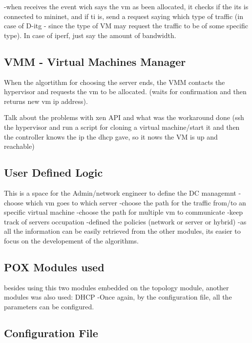 \documentclass[12pt,english,oneside]{book}
\begin{document}
-when receives the event wich says the vm as been allocated, it checks if the its is connected to mininet, and if ti is, send a request saying which type of traffic (in case of D-itg - since the type of VM may request the traffic to be of some specific type). In case of iperf, just say the amount of bandwidth.

\subsection{VMM - Virtual Machines Manager}
\hspace{0.6cm}

When the algortithm for choosing the server ends, the VMM contacts the hypervisor and requests the vm to be allocated. (waits for confirmation and then returns new vm ip address).

Talk about the problems with xen API and what was the workaround done (ssh the hypervisor and run a script for cloning a virtual machine/start it and then the controller knows the ip the dhcp gave, so it nows the VM is up and reachable)

\subsection{User Defined Logic}
\hspace{0.6cm}
 
This is a space for the Admin/network engineer to define the DC managemnt
-choose which vm goes to which server
-choose the path for the traffic from/to an specific virtual machine
-choose the path for multiple vm to communicate
-keep track of servers occupation
-defined the policies (network or server or hybrid)
-as all the information can be easily retrieved from the other modules, its easier to focus on the developement of the algorithms.

\subsection{POX Modules used}
\hspace{0.6cm}

besides using this two modules embedded on the topology module, another modules was also used: DHCP
-Once again, by the configuration file, all the parameters can be configured.

\subsection{Configuration File}
\hspace{0.6cm}
\end{document}
